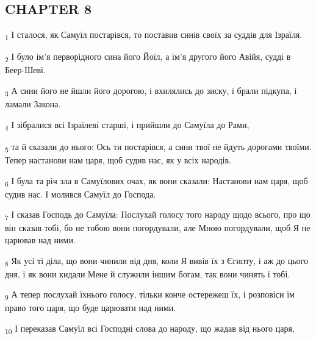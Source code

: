 \subsection{CHAPTER 8}
\begin{tcolorbox}
\textsubscript{1} І сталося, як Самуїл постарівся, то поставив синів своїх за суддів для Ізраїля.
\end{tcolorbox}
\begin{tcolorbox}
\textsubscript{2} І було ім'я перворідного сина його Йоїл, а ім'я другого його Авійя, судді в Беер-Шеві.
\end{tcolorbox}
\begin{tcolorbox}
\textsubscript{3} А сини його не йшли його дорогою, і вхилялись до зиску, і брали підкупа, і ламали Закона.
\end{tcolorbox}
\begin{tcolorbox}
\textsubscript{4} І зібралися всі Ізраїлеві старші, і прийшли до Самуїла до Рами,
\end{tcolorbox}
\begin{tcolorbox}
\textsubscript{5} та й сказали до нього: Ось ти постарівся, а сини твої не йдуть дорогами твоїми. Тепер настанови нам царя, щоб судив нас, як у всіх народів.
\end{tcolorbox}
\begin{tcolorbox}
\textsubscript{6} І була та річ зла в Самуїлових очах, як вони сказали: Настанови нам царя, щоб судив нас. І молився Самуїл до Господа.
\end{tcolorbox}
\begin{tcolorbox}
\textsubscript{7} І сказав Господь до Самуїла: Послухай голосу того народу щодо всього, про що він сказав тобі, бо не тобою вони погордували, але Мною погордували, щоб Я не царював над ними.
\end{tcolorbox}
\begin{tcolorbox}
\textsubscript{8} Як усі ті діла, що вони чинили від дня, коли Я вивів їх з Єгипту, і аж до цього дня, і як вони кидали Мене й служили іншим богам, так вони чинять і тобі.
\end{tcolorbox}
\begin{tcolorbox}
\textsubscript{9} А тепер послухай їхнього голосу, тільки конче остережеш їх, і розповіси їм право того царя, що буде царювати над ними.
\end{tcolorbox}
\begin{tcolorbox}
\textsubscript{10} І переказав Самуїл всі Господні слова до народу, що жадав від нього царя,
\end{tcolorbox}
